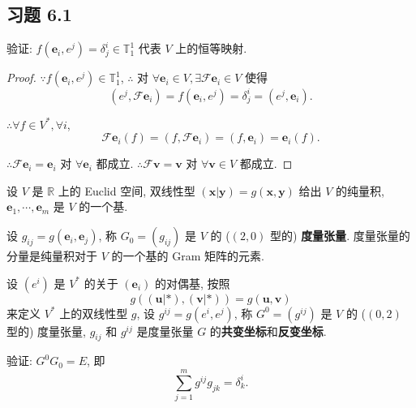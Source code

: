 \documentclass[color=black,device=normal,lang=cn,mode=geye]{elegantnote}
\begin{document}
\subsection{习题 6.1}
\begin{exercise}%
    验证: $f(\boldsymbol{e}_i,e^j)=\delta_j^i\in\mathbb{T}_1^1$ 代表 $V$ 上的恒等映射.
\end{exercise}
\begin{proof}
    $\because f(\boldsymbol{e}_i,e^j)\in\mathbb{T}_1^1$, $\therefore$ 对 $\forall\boldsymbol{e}_i\in V,\exists\mathcal{F}\boldsymbol{e}_i\in V$ 使得
    \[(e^j,\mathcal{F}\boldsymbol{e}_i)=f(\boldsymbol{e}_i,e^j)=\delta_j^i=(e^j,\boldsymbol{e}_i).\]

    $\therefore\forall f\in V^*,\forall i$,
    \[\mathcal{F}\boldsymbol{e}_i(f)=(f,\mathcal{F}\boldsymbol{e}_i)=(f,\boldsymbol{e}_i)=\boldsymbol{e}_i(f).\]
    
    $\therefore\mathcal{F}\boldsymbol{e}_i=\boldsymbol{e}_i$ 对 $\forall\boldsymbol{e}_i$ 都成立. $\therefore\mathcal{F}\boldsymbol{v}=\boldsymbol{v}$ 对 $\forall\boldsymbol{v}\in V$ 都成立.
\end{proof}
\begin{exercise}\label{ex1.2}
    设 $V$ 是 $\mathbb{R}$ 上的 Euclid 空间, 双线性型 $(\boldsymbol{x}|\boldsymbol{y})=g(\boldsymbol{x},\boldsymbol{y})$ 给出 $V$ 的纯量积, $\boldsymbol{e}_1,\cdots,\boldsymbol{e}_m$ 是 $V$ 的一个基.

    设 $g_{ij}=g(\boldsymbol{e}_i,\boldsymbol{e}_j)$, 称 $G_0=(g_{ij})$ 是 $V$ 的 ($(2,0)$ 型的) \textbf{度量张量}. 度量张量的分量是纯量积对于 $V$ 的一个基的 Gram 矩阵的元素.

    设 $(e^i)$ 是 $V^*$ 的关于 $(\boldsymbol{e}_i)$ 的对偶基, 按照
    \[g((\boldsymbol{u}|*),(\boldsymbol{v}|*))=g(\boldsymbol{u},\boldsymbol{v})\]
    来定义 $V^*$ 上的双线性型 $g$, 设 $g^{ij}=g(e^i,e^j)$, 称 $G^0=(g^{ij})$ 是 $V$ 的 ($(0,2)$ 型的) 度量张量, $g_{ij}$ 和 $g^{ij}$ 是度量张量 $G$ 的\textbf{共变坐标}和\textbf{反变坐标}.

    验证: $G^0G_0=E$, 即
    \[\sum\limits_{j=1}^mg^{ij}g_{jk}=\delta_k^i.\]
\end{exercise}
\end{document}
